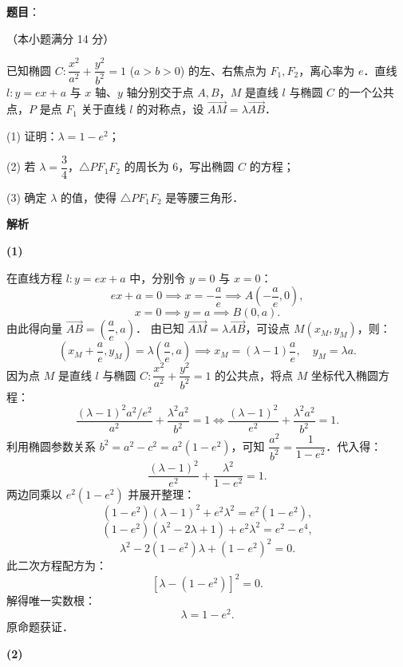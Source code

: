 \begin{answer}

\textbf{题目}：

（本小题满分 14 分）

已知椭圆 $C: \dfrac{x^2}{a^2} + \dfrac{y^2}{b^2} = 1$ ($a > b > 0$) 的左、右焦点为 $F_1, F_2$，离心率为 $e$．直线 $l: y = ex + a$ 与 $x$ 轴、$y$ 轴分别交于点 $A, B$，$M$ 是直线 $l$ 与椭圆 $C$ 的一个公共点，$P$ 是点 $F_1$ 关于直线 $l$ 的对称点，设 $\vec{AM} = \lambda\vec{AB}$．

(1) 证明：$\lambda = 1 - e^2$；

(2) 若 $\lambda = \dfrac{3}{4}$，$\triangle PF_1F_2$ 的周长为 6，写出椭圆 $C$ 的方程；

(3) 确定 $\lambda$ 的值，使得 $\triangle PF_1F_2$ 是等腰三角形．

\textbf{解析}

\textbf{(1)}

在直线方程 $l: y = ex + a$ 中，分别令 $y = 0$ 与 $x = 0$：
\nopagebreak[4]
\[
ex + a = 0 \implies x = -\frac{a}{e} \implies A\left(-\frac{a}{e}, 0\right),
\]
\nopagebreak[4]
\[
x = 0 \implies y = a \implies B(0, a).
\]
由此得向量 $\vec{AB} = \left(\dfrac{a}{e}, a\right)$．
由已知 $\vec{AM} = \lambda\vec{AB}$，可设点 $M(x_M, y_M)$，则：
\nopagebreak[4]
\[
\left(x_M + \frac{a}{e}, y_M\right) = \lambda\left(\frac{a}{e}, a\right) \implies x_M = (\lambda - 1)\frac{a}{e}, \quad y_M = \lambda a.
\]
因为点 $M$ 是直线 $l$ 与椭圆 $C: \dfrac{x^2}{a^2} + \dfrac{y^2}{b^2} = 1$ 的公共点，将点 $M$ 坐标代入椭圆方程：
\nopagebreak[4]
\[
\frac{(\lambda - 1)^2 a^2 / e^2}{a^2} + \frac{\lambda^2 a^2}{b^2} = 1 \iff \frac{(\lambda - 1)^2}{e^2} + \frac{\lambda^2 a^2}{b^2} = 1.
\]
利用椭圆参数关系 $b^2 = a^2 - c^2 = a^2(1 - e^2)$，可知 $\dfrac{a^2}{b^2} = \dfrac{1}{1 - e^2}$．代入得：
\nopagebreak[4]
\[
\frac{(\lambda - 1)^2}{e^2} + \frac{\lambda^2}{1 - e^2} = 1.
\]
两边同乘以 $e^2(1 - e^2)$ 并展开整理：
\nopagebreak[4]
\[
(1 - e^2)(\lambda - 1)^2 + e^2\lambda^2 = e^2(1 - e^2),
\]
\nopagebreak[4]
\[
(1 - e^2)(\lambda^2 - 2\lambda + 1) + e^2\lambda^2 = e^2 - e^4,
\]
\nopagebreak[4]
\[
\lambda^2 - 2(1 - e^2)\lambda + (1 - e^2)^2 = 0.
\]
此二次方程配方为：
\nopagebreak[4]
\[
[\lambda - (1 - e^2)]^2 = 0.
\]
解得唯一实数根：
\nopagebreak[4]
\[
\lambda = 1 - e^2.
\]
原命题获证．

\textbf{(2)}


\end{answer}
